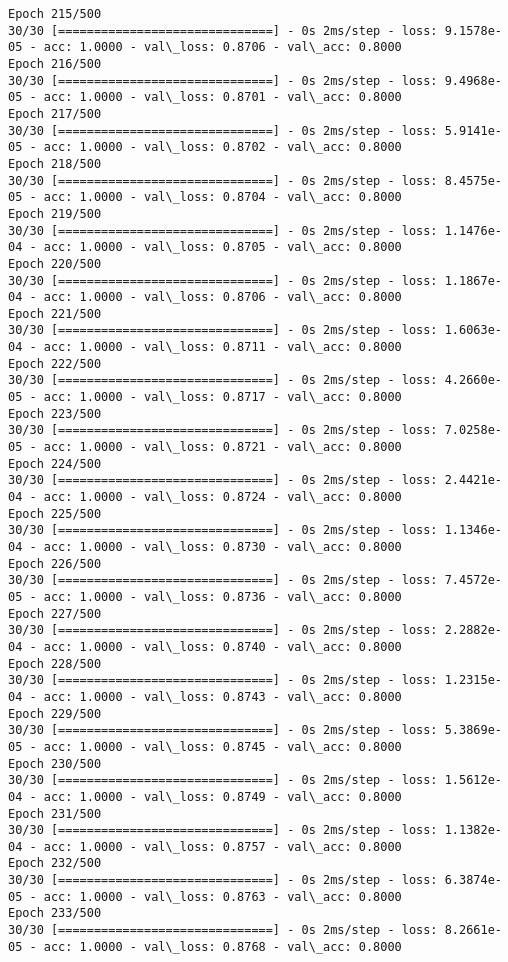 \documentclass[11pt]{article}
\begin{document}
\begin{Verbatim}[commandchars=\\\{\}]
Epoch 215/500
30/30 [==============================] - 0s 2ms/step - loss: 9.1578e-05 - acc: 1.0000 - val\_loss: 0.8706 - val\_acc: 0.8000
Epoch 216/500
30/30 [==============================] - 0s 2ms/step - loss: 9.4968e-05 - acc: 1.0000 - val\_loss: 0.8701 - val\_acc: 0.8000
Epoch 217/500
30/30 [==============================] - 0s 2ms/step - loss: 5.9141e-05 - acc: 1.0000 - val\_loss: 0.8702 - val\_acc: 0.8000
Epoch 218/500
30/30 [==============================] - 0s 2ms/step - loss: 8.4575e-05 - acc: 1.0000 - val\_loss: 0.8704 - val\_acc: 0.8000
Epoch 219/500
30/30 [==============================] - 0s 2ms/step - loss: 1.1476e-04 - acc: 1.0000 - val\_loss: 0.8705 - val\_acc: 0.8000
Epoch 220/500
30/30 [==============================] - 0s 2ms/step - loss: 1.1867e-04 - acc: 1.0000 - val\_loss: 0.8706 - val\_acc: 0.8000
Epoch 221/500
30/30 [==============================] - 0s 2ms/step - loss: 1.6063e-04 - acc: 1.0000 - val\_loss: 0.8711 - val\_acc: 0.8000
Epoch 222/500
30/30 [==============================] - 0s 2ms/step - loss: 4.2660e-05 - acc: 1.0000 - val\_loss: 0.8717 - val\_acc: 0.8000
Epoch 223/500
30/30 [==============================] - 0s 2ms/step - loss: 7.0258e-05 - acc: 1.0000 - val\_loss: 0.8721 - val\_acc: 0.8000
Epoch 224/500
30/30 [==============================] - 0s 2ms/step - loss: 2.4421e-04 - acc: 1.0000 - val\_loss: 0.8724 - val\_acc: 0.8000
Epoch 225/500
30/30 [==============================] - 0s 2ms/step - loss: 1.1346e-04 - acc: 1.0000 - val\_loss: 0.8730 - val\_acc: 0.8000
Epoch 226/500
30/30 [==============================] - 0s 2ms/step - loss: 7.4572e-05 - acc: 1.0000 - val\_loss: 0.8736 - val\_acc: 0.8000
Epoch 227/500
30/30 [==============================] - 0s 2ms/step - loss: 2.2882e-04 - acc: 1.0000 - val\_loss: 0.8740 - val\_acc: 0.8000
Epoch 228/500
30/30 [==============================] - 0s 2ms/step - loss: 1.2315e-04 - acc: 1.0000 - val\_loss: 0.8743 - val\_acc: 0.8000
Epoch 229/500
30/30 [==============================] - 0s 2ms/step - loss: 5.3869e-05 - acc: 1.0000 - val\_loss: 0.8745 - val\_acc: 0.8000
Epoch 230/500
30/30 [==============================] - 0s 2ms/step - loss: 1.5612e-04 - acc: 1.0000 - val\_loss: 0.8749 - val\_acc: 0.8000
Epoch 231/500
30/30 [==============================] - 0s 2ms/step - loss: 1.1382e-04 - acc: 1.0000 - val\_loss: 0.8757 - val\_acc: 0.8000
Epoch 232/500
30/30 [==============================] - 0s 2ms/step - loss: 6.3874e-05 - acc: 1.0000 - val\_loss: 0.8763 - val\_acc: 0.8000
Epoch 233/500
30/30 [==============================] - 0s 2ms/step - loss: 8.2661e-05 - acc: 1.0000 - val\_loss: 0.8768 - val\_acc: 0.8000

\end{Verbatim}
\end{document}
